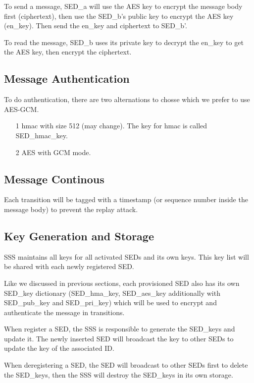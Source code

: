 \documentclass[11pt,oneside,onecolumn,letterpaper]{article}
\begin{document}
To send a message, SED\_a will use the AES key to encrypt the message body first (ciphertext), then use the SED\_b's public key to encrypt the AES key (en\_key).
Then send the en\_key and ciphertext to SED\_b'.

To read the message, SED\_b uses its private key to decrypt the en\_key to get the AES key, then encrypt the ciphertext. 

\subsection{Message Authentication}
To do authentication, there are two alternations to chosse which we prefer to use AES-GCM.
\begin{itemize}
  \item[1] hmac with size 512 (may change).
  The key for hmac is called SED\_hmac\_key.
  \item[2] AES with GCM mode.
\end{itemize}

\subsection{Message Continous}
Each transition will be tagged with a timestamp (or sequence number inside the message body) to prevent the replay attack.

\subsection{Key Generation and Storage}
SSS maintains all keys for all activated SEDs and its own keys.
This key list will be shared with each newly registered SED.

Like we discussed in previous sections, each provisioned SED also has its own SED\_key dictionary (SED\_hma\_key, SED\_aes\_key additionally with SED\_pub\_key and SED\_pri\_key) which will be used to encrypt and authenticate the message in transitions.

When register a SED, the SSS is responsible to generate the SED\_keys and update it.
The newly inserted SED will broadcast the key to other SEDs to update the key of the associated ID.

When deregistering a SED, the SED will broadcast to other SEDs first to delete the SED\_keys, then the SSS will destroy the SED\_keys in its own storage.
\end{document}
